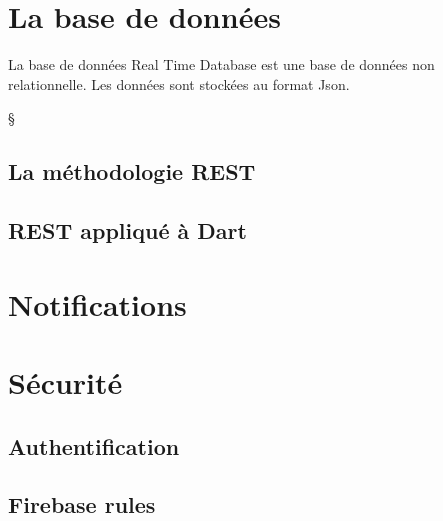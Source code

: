 \section{La base de données}
La base de données Real Time Database est une base de données non relationnelle. Les données sont stockées au format Json.

§
\subsection{La méthodologie REST}
\subsection{REST appliqué à Dart}


\section{Notifications}



\section{Sécurité}

\subsection{Authentification}

\subsection{Firebase rules}
